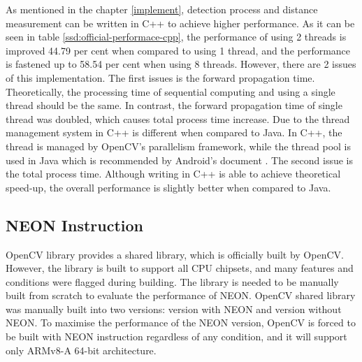             As mentioned in the chapter \ref{implement},
            detection process and distance measurement can be written in C++ to achieve higher performance.
            As it can be seen in table \ref{ssd:official-performace-cpp},
            the performance of using 2 threads is improved 44.79 per cent when compared to using 1 thread,
            and the performance is fastened up to 58.54 per cent when using 8 threads.
            However, there are 2 issues of this implementation.
            The first issues is the forward propagation time.
                Theoretically, the processing time of sequential computing and using a single thread should be the same.
                In contrast, the forward propagation time of single thread was doubled,
                which causes total process time increase.
                Due to the thread management system in C++ is different when compared to Java.
                In C++, the thread is managed by OpenCV's parallelism framework, while
                the thread pool is used in Java which is recommended by Android's document \cite{ANDROID-01}.
            The second issue is the total process time.
                Although writing in C++ is able to achieve theoretical speed-up,
                the overall performance is slightly better when compared to Java.

        \subsection{NEON Instruction}
            OpenCV library provides a shared library, which is officially built by OpenCV.
            However, the library is built to support all CPU chipsets, and many features and conditions were flagged during building.
            The library is needed to be manually built from scratch to evaluate the performance of NEON.
            OpenCV shared library was manually built into two versions: version with NEON and version without NEON.
            To maximise the performance of the NEON version, OpenCV is forced to be built with NEON instruction regardless of any condition,
            and it will support only ARMv8-A 64-bit architecture.

